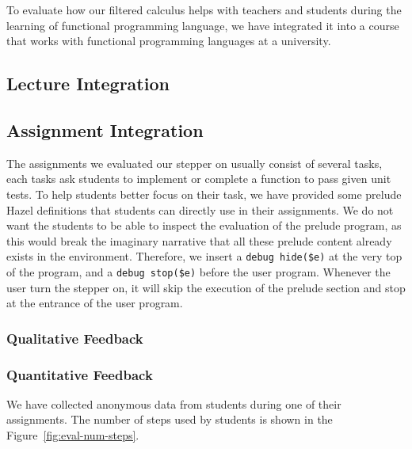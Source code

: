 
To evaluate how our filtered calculus helps with teachers and students during the learning of functional programming language,
we have integrated it into a course that works with functional programming languages at a university.

\subsection{Lecture Integration}


\subsection{Assignment Integration}

The assignments we evaluated our stepper on usually consist of several
tasks, each tasks ask students to implement or complete a function to
pass given unit tests. To help students better focus on their task, we
have provided some prelude Hazel definitions that students can
directly use in their assignments. We do not want the students to be
able to inspect the evaluation of the prelude program, as this would
break the imaginary narrative that all these prelude content already
exists in the environment. Therefore, we insert a
\lstinline[language=hazel]{debug hide($e)} at the very top of the
program, and a \lstinline[language=hazel]{debug stop($e)} before the
user program. Whenever the user turn the stepper on, it will skip the
execution of the prelude section and stop at the entrance of the user
program.

\subsubsection{Qualitative Feedback}


\subsubsection{Quantitative Feedback}

We have collected anonymous data from students during one of their
assignments. The number of steps used by students is shown in the
Figure~\ref{fig:eval-num-steps}.

